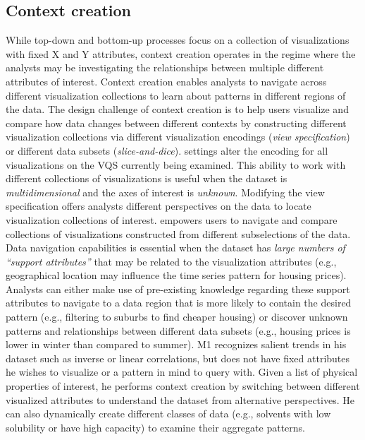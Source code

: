 {  \subsection{Context creation}
  While top-down and bottom-up processes focus on a collection of visualizations with fixed X and Y attributes, context creation operates in the regime where the analysts may be investigating the relationships between multiple different attributes of interest. Context creation enables analysts to navigate across different visualization collections to learn about patterns in different regions of the data. The design challenge of context creation is to help users visualize and compare how data changes between different contexts by constructing different visualization collections via different visualization encodings (\textit{view specification}) or different data subsets (\textit{slice-and-dice}).%
   settings alter the encoding for all visualizations on the VQS currently being examined. This ability to work with different collections of visualizations is useful when the dataset is \emph{multidimensional} and the axes of interest is \emph{unknown}. Modifying the view specification offers analysts different perspectives on the data to locate visualization collections of interest.
   empowers users to navigate and compare collections of visualizations constructed from different subselections of the data. Data navigation capabilities is essential when the dataset has \emph{large numbers of ``support attributes''} that may be related to the visualization attributes (e.g., geographical location may influence the time series pattern for housing prices). Analysts can either make use of pre-existing knowledge regarding these support attributes to navigate to a data region that is more likely to contain the desired pattern (e.g., filtering to suburbs to find cheaper housing) or discover unknown patterns and relationships between different data subsets (e.g., housing prices is lower in winter than compared to summer).%
   M1 recognizes salient trends in his dataset such as inverse or linear correlations, but does not have fixed attributes he wishes to visualize or a pattern in mind to query with. Given a list of physical properties of interest, he performs context creation by switching between different visualized attributes to understand the dataset from alternative perspectives. He can also dynamically create different classes of data (e.g., solvents with low solubility or have high capacity) to examine their aggregate patterns.
}
